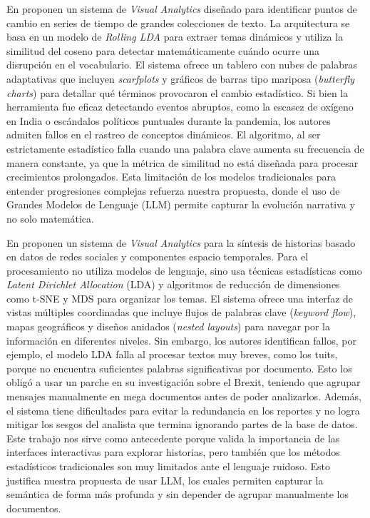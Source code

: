 En \cite{krause2023} proponen un sistema de \textit{Visual Analytics} diseñado para identificar puntos de cambio en series de tiempo de grandes colecciones de texto. La arquitectura se basa en un modelo de \textit{Rolling \ac{LDA}} para extraer temas dinámicos y utiliza la similitud del coseno para detectar matemáticamente cuándo ocurre una disrupción en el vocabulario. El sistema ofrece un tablero con nubes de palabras adaptativas que incluyen \textit{scarfplots} y gráficos de barras tipo mariposa (\textit{butterfly charts}) para detallar qué términos provocaron el cambio estadístico. Si bien la herramienta fue eficaz detectando eventos abruptos, como la escasez de oxígeno en India o escándalos políticos puntuales durante la pandemia, los autores admiten fallos en el rastreo de conceptos dinámicos. El algoritmo, al ser estrictamente estadístico falla cuando una palabra clave aumenta su frecuencia de manera constante, ya que la métrica de similitud no está diseñada para procesar crecimientos prolongados. Esta limitación de los modelos tradicionales para entender progresiones complejas refuerza nuestra propuesta, donde el uso de Grandes Modelos de Lenguaje (\acs{LLM}) permite capturar la evolución narrativa y no solo matemática.










En \cite{chen2019supporting} proponen un sistema de \textit{Visual Analytics} para la síntesis de historias basado en datos de redes sociales y componentes espacio temporales. Para el procesamiento no utiliza modelos de lenguaje, sino usa técnicas estadísticas como \textit{Latent Dirichlet Allocation} (\acs{LDA}) y algoritmos de reducción de dimensiones como t-SNE y \ac{MDS} para organizar los temas. El sistema ofrece una interfaz de vistas múltiples coordinadas que incluye flujos de palabras clave (\textit{keyword flow}), mapas geográficos y diseños anidados (\textit{nested layouts}) para navegar por la información en diferentes niveles. Sin embargo, los autores identifican fallos, por ejemplo, el modelo \acs{LDA} falla al procesar textos muy breves, como los tuits, porque no encuentra suficientes palabras significativas por documento. Esto los obligó a usar un parche en su investigación sobre el Brexit, teniendo que agrupar mensajes manualmente en mega documentos antes de poder analizarlos. Además, el sistema tiene dificultades para evitar la redundancia en los reportes y no logra mitigar los sesgos del analista que termina ignorando partes de la base de datos. Este trabajo nos sirve como antecedente porque valida la importancia de las interfaces interactivas para explorar historias, pero también que los métodos estadísticos tradicionales son muy limitados ante el lenguaje ruidoso. Esto justifica nuestra propuesta de usar \acs{LLM}, los cuales permiten capturar la semántica de forma más profunda y sin depender de agrupar manualmente los documentos.








